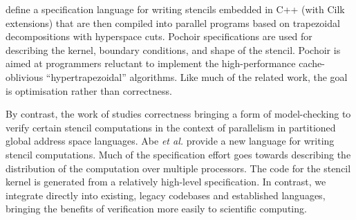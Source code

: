 \citet{Tang:2011:SPAA} define a specification language for writing stencils
embedded in C++ (with Cilk~\citep{blumofe1996cilk} extensions) that are then
compiled into parallel programs based on trapezoidal decompositions with
hyperspace cuts. Pochoir specifications are used for describing the kernel,
boundary conditions, and shape of the stencil. Pochoir is aimed at programmers
reluctant to implement the high-performance cache-oblivious ``hypertrapezoidal''
algorithms.  Like much of the related work, the goal is optimisation rather than
correctness.

By contrast, the work of \citet{Abe:2013:IPDPSW} studies correctness bringing a
form of model-checking to verify certain stencil computations in the context of
parallelism in partitioned global address
space languages. %
Abe \emph{et al.} provide a new language for writing stencil computations. Much
of the specification effort goes towards describing the distribution of the
computation over multiple processors. The code for the stencil kernel is
generated from a relatively high-level specification.  In contrast, we integrate
directly into existing, legacy codebases and established languages, bringing
the benefits of verification more easily to scientific computing.%
